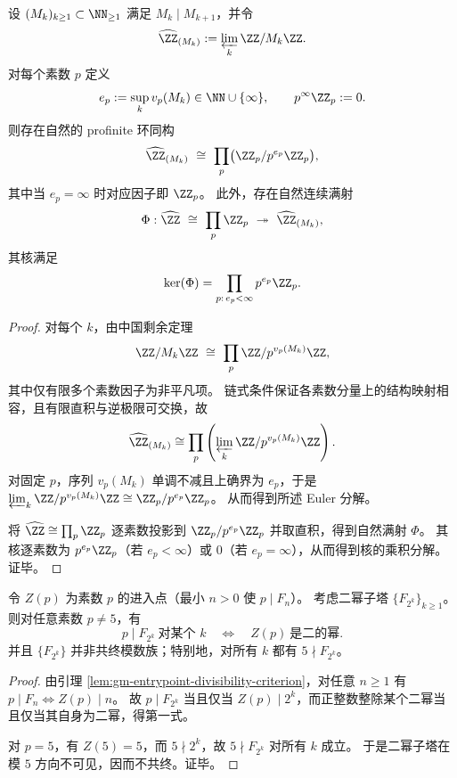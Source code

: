 \begin{theorem}\label{thm:gm-chain-profinite-euler-decomposition}
设 \((M_k)_{k\ge 1}\subset\NN_{\ge 1}\) 满足 \(M_k\mid M_{k+1}\)，并令
\[
\widehat{\ZZ}_{(M_k)}:=\varprojlim_k \ZZ/M_k\ZZ.
\]
对每个素数 \(p\) 定义
\[
e_p:=\sup_k v_p(M_k)\in\NN\cup\{\infty\},
\qquad p^{\infty}\ZZ_p:=0.
\]
则存在自然的 profinite 环同构
\[
\widehat{\ZZ}_{(M_k)}\ \cong\ \prod_{p}\bigl(\ZZ_p/p^{e_p}\ZZ_p\bigr),
\]
其中当 \(e_p=\infty\) 时对应因子即 \(\ZZ_p\)。
此外，存在自然连续满射
\[
\Phi:\widehat{\ZZ}\ \cong\ \prod_p\ZZ_p\ \twoheadrightarrow\ \widehat{\ZZ}_{(M_k)},
\]
其核满足
\[
\ker(\Phi)=\prod_{p:\,e_p<\infty}p^{e_p}\ZZ_p.
\]
\end{theorem}
\begin{proof}
对每个 \(k\)，由中国剩余定理
\[
\ZZ/M_k\ZZ\ \cong\ \prod_{p}\ZZ/p^{v_p(M_k)}\ZZ,
\]
其中仅有限多个素数因子为非平凡项。
链式条件保证各素数分量上的结构映射相容，且有限直积与逆极限可交换，故
\[
\widehat{\ZZ}_{(M_k)}
\cong
\prod_{p}\left(\varprojlim_k \ZZ/p^{v_p(M_k)}\ZZ\right).
\]
对固定 \(p\)，序列 \(v_p(M_k)\) 单调不减且上确界为 \(e_p\)，于是
\(
\varprojlim_k \ZZ/p^{v_p(M_k)}\ZZ\cong \ZZ_p/p^{e_p}\ZZ_p
\)。
从而得到所述 Euler 分解。
\par
将 \(\widehat{\ZZ}\cong\prod_p\ZZ_p\) 逐素数投影到 \(\ZZ_p/p^{e_p}\ZZ_p\) 并取直积，得到自然满射 \(\Phi\)。
其核逐素数为 \(p^{e_p}\ZZ_p\)（若 \(e_p<\infty\)）或 \(0\)（若 \(e_p=\infty\)），从而得到核的乘积分解。证毕。
\end{proof}

\begin{proposition}\label{prop:gm-fibonacci-2power-visible-primes}
令 \(Z(p)\) 为素数 \(p\) 的进入点（最小 \(n>0\) 使 \(p\mid F_n\)）。
考虑二幂子塔 \(\{F_{2^k}\}_{k\ge 1}\)。
则对任意素数 \(p\neq 5\)，有
\[
p\mid F_{2^k}\ \text{对某个 }k
\quad\Longleftrightarrow\quad
Z(p)\ \text{是二的幂}.
\]
并且 \(\{F_{2^k}\}\) 并非共终模数族；特别地，对所有 \(k\) 都有 \(5\nmid F_{2^k}\)。
\end{proposition}
\begin{proof}
由引理 \ref{lem:gm-entrypoint-divisibility-criterion}，对任意 \(n\ge 1\) 有 \(p\mid F_n\iff Z(p)\mid n\)。
故 \(p\mid F_{2^k}\) 当且仅当 \(Z(p)\mid 2^k\)，而正整数整除某个二幂当且仅当其自身为二幂，得第一式。
\par
对 \(p=5\)，有 \(Z(5)=5\)，而 \(5\nmid 2^k\)，故 \(5\nmid F_{2^k}\) 对所有 \(k\) 成立。
于是二幂子塔在模 \(5\) 方向不可见，因而不共终。证毕。
\end{proof}

